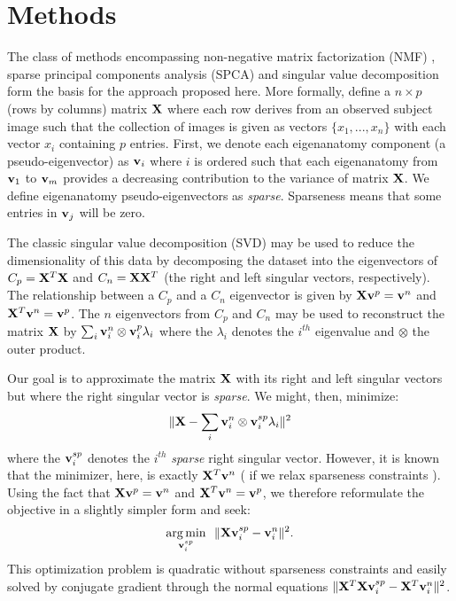 \documentclass{llncs}
\newcommand{\X}{{\bf X}}
\newcommand{\vv}{{\bf v}}
\begin{document}
\section*{Methods}
The class of methods encompassing non-negative matrix factorization
(NMF) \cite{Lee1999,sparseNMF_hoyer,sparseNMF_kim,sparseNMF_heiler},
sparse principal components analysis (SPCA)
\cite{sparsePCA_zou,sparsePCA_jordan,sparsePCA_journee,sparsePCA_witten,Gandy2010,Lee2011}
and singular value decomposition \cite{Sill2011,Lee2010b,Yeung2002}
form the basis for the approach proposed here. More formally, define a
$n \times p$ (rows by columns) matrix $\X$ where each row derives from
an observed subject image such that the collection of images is given
as vectors $\{x_1,...,x_n\}$ with each vector $x_i$ containing $p$ entries.  
First, we denote each eigenanatomy component (a pseudo-eigenvector) as
${\vv}_i$ where $i$ is ordered such that each eigenanatomy from
${\vv}_1$ to ${\vv}_m$ provides a decreasing contribution to the
variance of matrix $\X$.  We define eigenanatomy pseudo-eigenvectors as {\em
  sparse}.  Sparseness means that some entries in ${\vv}_j$ will be zero.
 
The classic singular value decomposition (SVD) may be used to reduce the dimensionality of this data by decomposing the dataset into the eigenvectors of $C_p = \X^T\X$ and $C_n = \X\X^T$ (the right and left singular vectors, respectively).  
The relationship between a $C_p$ and a $C_n$ eigenvector is given by $\X \vv^p = \vv^n$ and $\X^T \vv^n = \vv^p$.  
The $n$ eigenvectors from $C_p$ and $C_n$ may be used to reconstruct the matrix $\X$ by 
$\sum_i \vv^n_i \otimes \vv^p_i \lambda_i $
where the $\lambda_i$ denotes the $i^{th}$ eigenvalue and $\otimes$ the outer product.

Our goal is to approximate the matrix $\X$ with its right and left singular vectors but where the right singular vector is {\em sparse}.  We might, then, minimize:
\begin{eqnarray}
\label{eq:recon}
\| \X  -  \sum_i \vv^n_i \otimes \vv^{sp}_i \lambda_i  \|^2
\end{eqnarray}
where the $\vv^{sp}_i$ denotes the $i^{th}$ {\em sparse} right singular vector.  However, it is known that the minimizer, here, is exactly $\X^T \vv^n$ ( if we relax sparseness constraints ).  Using the fact that $\X \vv^p = \vv^n$ and $\X^T \vv^n = \vv^p$,  we therefore reformulate the objective in a slightly simpler form and seek:
\begin{eqnarray}
\label{eq:basic}
\underset{\vv^{sp}_i}{\operatorname{arg\,min}}~~\|  \X \vv^{sp}_i - \vv_i^n \|^2 . 
\end{eqnarray}
This optimization problem is quadratic without sparseness constraints and easily solved by conjugate gradient through the normal equations $\| \X^T\X \vv^{sp}_i - \X^T\vv_i^n \|^2$.
\end{document}
